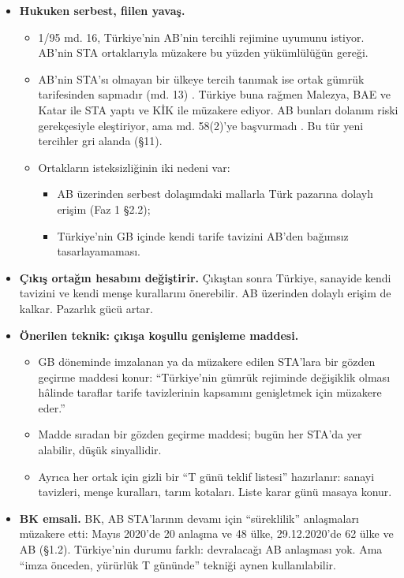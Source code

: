 \begin{itemize}
\tightlist
\item
  \textbf{Hukuken serbest, fiilen yavaş.}

  \begin{itemize}
  \tightlist
  \item
    1/95 md. 16, Türkiye'nin AB'nin tercihli rejimine uyumunu istiyor. AB'nin STA ortaklarıyla müzakere bu yüzden yükümlülüğün gereği.
  \item
    AB'nin STA'sı olmayan bir ülkeye tercih tanımak ise ortak gümrük tarifesinden sapmadır (md. 13) \etiketV{}. Türkiye buna rağmen Malezya, BAE ve Katar ile STA yaptı ve KİK ile müzakere ediyor. AB bunları dolanım riski gerekçesiyle eleştiriyor, ama md. 58(2)'ye başvurmadı \etiketD{}. Bu tür yeni tercihler gri alanda (§11).
  \item
    Ortakların isteksizliğinin iki nedeni var:

    \begin{itemize}
    \tightlist
    \item
      AB üzerinden serbest dolaşımdaki mallarla Türk pazarına dolaylı erişim (Faz 1 §2.2);
    \item
      Türkiye'nin GB içinde kendi tarife tavizini AB'den bağımsız tasarlayamaması.
    \end{itemize}
  \end{itemize}
\item
  \textbf{Çıkış ortağın hesabını değiştirir.} Çıkıştan sonra Türkiye, sanayide kendi tavizini ve kendi menşe kurallarını önerebilir. AB üzerinden dolaylı erişim de kalkar. Pazarlık gücü artar.
\item
  \textbf{Önerilen teknik: çıkışa koşullu genişleme maddesi.}

  \begin{itemize}
  \tightlist
  \item
    GB döneminde imzalanan ya da müzakere edilen STA'lara bir gözden geçirme maddesi konur: ``Türkiye'nin gümrük rejiminde değişiklik olması hâlinde taraflar tarife tavizlerinin kapsamını genişletmek için müzakere eder.''
  \item
    Madde sıradan bir gözden geçirme maddesi; bugün her STA'da yer alabilir, düşük sinyallidir.
  \item
    Ayrıca her ortak için gizli bir ``T günü teklif listesi'' hazırlanır: sanayi tavizleri, menşe kuralları, tarım kotaları. Liste karar günü masaya konur.
  \end{itemize}
\item
  \textbf{BK emsali.} BK, AB STA'larının devamı için ``süreklilik'' anlaşmaları müzakere etti: Mayıs 2020'de 20 anlaşma ve 48 ülke, 29.12.2020'de 62 ülke ve AB (§1.2). Türkiye'nin durumu farklı: devralacağı AB anlaşması yok. Ama ``imza önceden, yürürlük T gününde'' tekniği aynen kullanılabilir.
\end{itemize}


